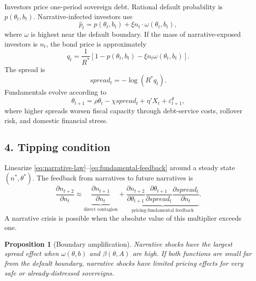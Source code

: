 \documentclass[11pt]{article}
\newtheorem{proposition}{Proposition}
\begin{document}
Investors price one-period sovereign debt. Rational default probability is $p(\theta_t,b_t)$. Narrative-infected investors use
\begin{equation}
\widehat p_t=p(\theta_t,b_t)+\xi n_t \cdot \omega(\theta_t,b_t), \label{eq:narrative-belief}
\end{equation}
where $\omega$ is highest near the default boundary. If the mass of narrative-exposed investors is $n_t$, the bond price is approximately
\begin{equation}
q_t=\frac{1}{R^*}\left[1-p(\theta_t,b_t)-\xi n_t\omega(\theta_t,b_t)\right]. \label{eq:narrative-price}
\end{equation}
The spread is
\begin{equation}
spread_t=-\log(R^*q_t). \label{eq:narrative-spread}
\end{equation}
Fundamentals evolve according to
\begin{equation}
\theta_{t+1}=\rho\theta_t-\chi spread_t+\eta'X_t+\varepsilon^\theta_{t+1}, \label{eq:fundamental-feedback}
\end{equation}
where higher spreads worsen fiscal capacity through debt-service costs, rollover risk, and domestic financial stress.

\subsection*{4. Tipping condition}
Linearize \eqref{eq:narrative-law}--\eqref{eq:fundamental-feedback} around a steady state $(n^*,\theta^*)$. The feedback from narratives to future narratives is
\begin{equation}
\frac{\partial n_{t+2}}{\partial n_t}
\approx \underbrace{\frac{\partial n_{t+1}}{\partial n_t}}_{\text{direct contagion}}
+\underbrace{\frac{\partial n_{t+2}}{\partial \theta_{t+1}}\frac{\partial \theta_{t+1}}{\partial spread_t}\frac{\partial spread_t}{\partial n_t}}_{\text{pricing-fundamental feedback}}. \label{eq:tipping}
\end{equation}
A narrative crisis is possible when the absolute value of this multiplier exceeds one.

\begin{proposition}[Boundary amplification]
Narrative shocks have the largest spread effect when $\omega(\theta,b)$ and $\beta(\theta,A)$ are high. If both functions are small far from the default boundary, narrative shocks have limited pricing effects for very safe or already-distressed sovereigns.
\end{proposition}
\end{document}
